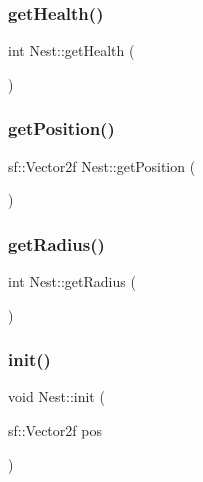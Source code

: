 \mbox{\label{class_nest_a31a181f820acdcc53c5c0954ec57bdd2}} 
\subsubsection{\texorpdfstring{get\+Health()}{getHealth()}}
{\footnotesize\ttfamily int Nest\+::get\+Health (\begin{DoxyParamCaption}{ }\end{DoxyParamCaption})}

\mbox{\label{class_nest_a3904c58d1826997b98bdfd8b357ba6fa}} 
\subsubsection{\texorpdfstring{get\+Position()}{getPosition()}}
{\footnotesize\ttfamily sf\+::\+Vector2f Nest\+::get\+Position (\begin{DoxyParamCaption}{ }\end{DoxyParamCaption})}

\mbox{\label{class_nest_a83653533eadad995b464a8a068257fe8}} 
\subsubsection{\texorpdfstring{get\+Radius()}{getRadius()}}
{\footnotesize\ttfamily int Nest\+::get\+Radius (\begin{DoxyParamCaption}{ }\end{DoxyParamCaption})}

\mbox{\label{class_nest_a1b243050144c8b5200bd3e8a4370565a}} 
\subsubsection{\texorpdfstring{init()}{init()}}
{\footnotesize\ttfamily void Nest\+::init (\begin{DoxyParamCaption}\item[{sf\+::\+Vector2f}]{pos }\end{DoxyParamCaption})}

